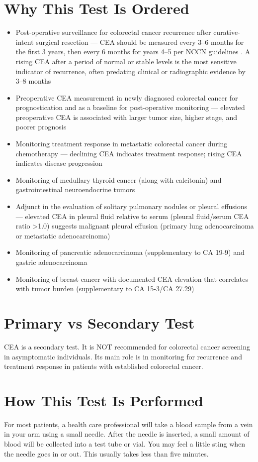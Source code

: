 \section*{Why This Test Is Ordered}
\begin{itemize}
  \item Post-operative surveillance for colorectal cancer recurrence after curative-intent surgical resection --- CEA should be measured every 3--6 months for the first 3 years, then every 6 months for years 4--5 per NCCN guidelines \cite{benson2021colon}. A rising CEA after a period of normal or stable levels is the most sensitive indicator of recurrence, often predating clinical or radiographic evidence by 3--8 months
  \item Preoperative CEA measurement in newly diagnosed colorectal cancer for prognostication and as a baseline for post-operative monitoring --- elevated preoperative CEA is associated with larger tumor size, higher stage, and poorer prognosis
  \item Monitoring treatment response in metastatic colorectal cancer during chemotherapy --- declining CEA indicates treatment response; rising CEA indicates disease progression
  \item Monitoring of medullary thyroid cancer (along with calcitonin) and gastrointestinal neuroendocrine tumors
  \item Adjunct in the evaluation of solitary pulmonary nodules or pleural effusions --- elevated CEA in pleural fluid relative to serum (pleural fluid/serum CEA ratio >1.0) suggests malignant pleural effusion (primary lung adenocarcinoma or metastatic adenocarcinoma)
  \item Monitoring of pancreatic adenocarcinoma (supplementary to CA 19-9) and gastric adenocarcinoma
  \item Monitoring of breast cancer with documented CEA elevation that correlates with tumor burden (supplementary to CA 15-3/CA 27.29)
\end{itemize}

\section*{Primary vs Secondary Test}
CEA is a secondary test. It is NOT recommended for colorectal cancer screening in asymptomatic individuals. Its main role is in monitoring for recurrence and treatment response in patients with established colorectal cancer.

\section*{How This Test Is Performed}
For most patients, a health care professional will take a blood sample from a vein in your arm using a small needle. After the needle is inserted, a small amount of blood will be collected into a test tube or vial. You may feel a little sting when the needle goes in or out. This usually takes less than five minutes.

